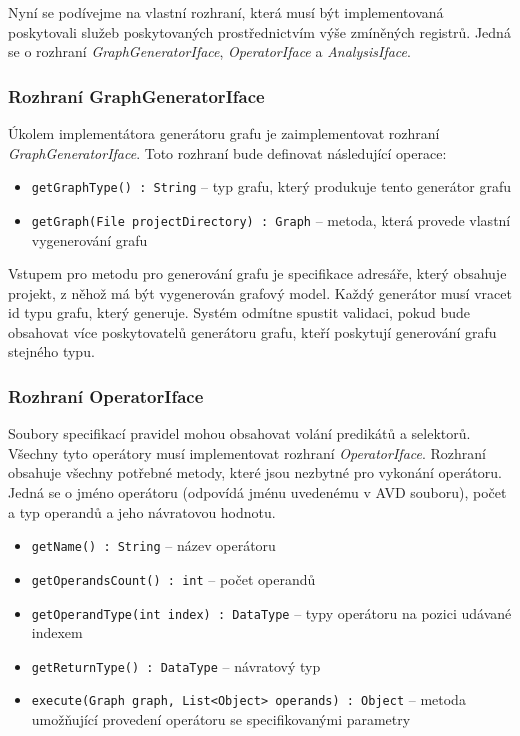 Nyní se podívejme na vlastní rozhraní, která musí být implementovaná poskytovali služeb poskytovaných prostřednictvím výše zmíněných registrů. Jedná se o rozhraní \emph{GraphGeneratorIface}, \emph{OperatorIface} a \emph{AnalysisIface}.

\subsubsection{Rozhraní GraphGeneratorIface}
Úkolem implementátora generátoru grafu je zaimplementovat rozhraní \emph{GraphGeneratorIface}. Toto rozhraní bude definovat následující operace:
\begin{itemize}
\item \verb-getGraphType() : String- -- typ grafu, který produkuje tento generátor grafu
\item \verb-getGraph(File projectDirectory) : Graph- -- metoda, která provede vlastní vygenerování grafu
\end{itemize}

Vstupem pro metodu pro generování grafu je specifikace adresáře, který obsahuje projekt, z něhož má být vygenerován grafový model. Každý generátor musí vracet id typu grafu, který generuje. Systém odmítne spustit validaci, pokud bude obsahovat více poskytovatelů generátoru grafu, kteří poskytují generování grafu stejného typu.

\subsubsection{Rozhraní OperatorIface}
Soubory specifikací pravidel mohou obsahovat volání predikátů a selektorů. Všechny tyto operátory musí implementovat rozhraní \emph{OperatorIface}. Rozhraní obsahuje všechny potřebné metody, které jsou nezbytné pro vykonání operátoru. Jedná se o jméno operátoru (odpovídá jménu uvedenému v AVD souboru), počet a typ operandů a jeho návratovou hodnotu.

\begin{itemize}
\item \verb-getName() : String- -- název operátoru
\item \verb-getOperandsCount() : int- -- počet operandů
\item \verb-getOperandType(int index) : DataType- -- typy operátoru na pozici udávané indexem
\item \verb-getReturnType() : DataType- -- návratový typ
\item \verb-execute(Graph graph, List<Object> operands) : Object- -- metoda umožňující provedení operátoru se specifikovanými parametry
\end{itemize}

